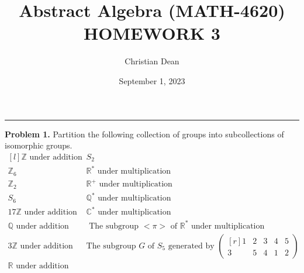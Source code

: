 \documentclass[12pt, letterpaper]{article}
\title{Abstract Algebra (MATH-4620) HOMEWORK 3}
\author{Christian Dean}
\date{September 1, 2023}
\newenvironment{problem}
    [1]
    {\noindent \textbf{Problem #1.}}
    {\vspace{3mm}}
\begin{document}
\maketitle

\noindent\hfil\rule{16cm}{0.4pt}\hfil

\begin{problem}{1}
    Partition the following collection of groups into subcollections of isomorphic groups.
    $$
    \begin{matrix*}[l]
        \mathbb{Z} \text{ under addition} & S_2\\
        
        \mathbb{Z}_6 & \mathbb{R}^* \text{ under multiplication}\\
        
        \mathbb{Z}_2 & \mathbb{R}^+ \text{ under multiplication}\\
        
        S_6 & \mathbb{Q}^* \text{ under multiplication}\\
        
        17\mathbb{Z} \text { under addition} & \mathbb{C}^* \text{ under multiplication}\\
        
        \mathbb{Q} \text{ under addition} & \text{ The subgroup } {<}\pi{>}
        \text{ of }\mathbb{R}^* \text{ under multiplication}\\

        3\mathbb{Z} \text{ under addition} & \text{The subgroup } G \text{ of } S_5
        \text{ generated by } \begin{pmatrix*}[r] 
            1 & 2 & 3 & 4 & 5\\
            3 & 5 & 4 & 1 & 2
        \end{pmatrix*}\\

        \mathbb{R} \text{ under addition}
    \end{matrix*}
    $$
\end{problem}
\end{document}

